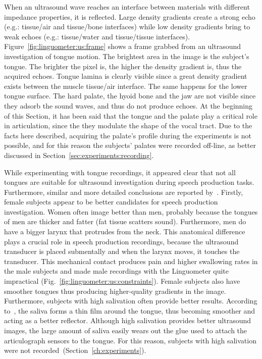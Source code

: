 
When an ultrasound wave reaches an interface between materials with different
impedance properties, it is reflected. Large density gradients create a strong
echo (e.g.: tissue/air and tissue/bone interfaces) while low density gradients
bring to weak echoes (e.g.: tissue/water and tissue/tissue interfaces).
Figure~\ref{fig:linguometer:us:frame} shows a frame grabbed from an ultrasound
investigation of tongue motion.
The brightest area in the image is the subject's tongue. The brighter the
pixel is, the higher the density gradient is, thus the acquired echoes.
Tongue lamina is clearly visible since a great density gradient exists between
the muscle tissue/air interface.
The same happens for the lower tongue surface.
The hard palate, the hyoid bone and the jaw are not visible since they adsorb
the sound waves, and thus do not produce echoes. 
At the beginning of this Section, it has been said that the tongue and the
palate play a critical role in articulation, since the they modulate the shape
of the vocal tract.
Due to the facts here described, acquiring the palate's profile during the
experiments is not possible, and for this reason the subjects' palates were
recorded off-line, as better discussed in
Section~\ref{sec:experiments:recording}.

While experimenting with tongue recordings, it appeared clear that not all
tongues are suitable for ultrasound investigation during speech production 
tasks.
Furthermore, similar and more detailed conclusions are reported
by~\citet{stone:2005}.
Firstly, female subjects appear to be better candidates for speech production
investigation. Women often image better than men, probably because the tongues
of men are thicker and fatter (fat tissue scatters sound).
Furthermore, men do have a bigger larynx that protrudes from the neck. This
anatomical difference plays a crucial role in speech production recordings,
because the ultrasound transducer is placed submentally and when the larynx
moves, it touches the transducer. 
This mechanical contact produces pain and higher swallowing rates in the
male subjects and made male recordings with the Linguometer quite impractical 
(Fig.~\ref{fig:linguometer:us:constraints}).
Female subjects also have smoother tongues thus producing higher-quality
gradients in the image.
Furthermore, subjects with high salivation often provide better results.
According to~\citet{stone:2005}, the saliva forms a thin film around the tongue,
thus becoming smoother and acting as a better reflector.
Although high salivation provides better ultrasound images, the large amount of
saliva easily wears out the glue used to attach the articulograph sensors to the
tongue. For this reason, subjects with high salivation were not
recorded~(Section~\ref{ch:experiments}).

